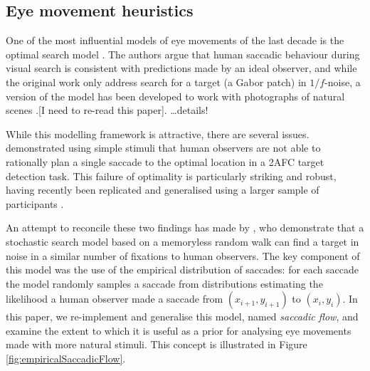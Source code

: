 \documentclass[a4paper, twocolumn, oneside, 10pt]{article}
\begin{document}
\subsection{Eye movement heuristics}

One of the most influential models of eye movements of the last decade is the optimal search model \citep{najemnik-geisler2008}. The authors argue that human saccadic behaviour during visual search is consistent with predictions made by an ideal observer, and while the original work only address search for a target (a Gabor patch) in $1/f$-noise, a version of the model has been developed to work with photographs of natural scenes \citep{abrams2014}.[I need to re-read this paper]. \ldots details!

While this modelling framework is attractive, there are several issues. \cite{morvan-maloney2012} demonstrated using simple stimuli that human observers are not able to rationally plan a single saccade to the optimal location in a 2AFC target detection task. This failure of optimality is particularly striking and robust, having recently been replicated and generalised using a larger sample of participants \citep{clarke-hunt2015}.

An attempt to reconcile these two findings has made by \cite{clarke2015}, who demonstrate that a stochastic search model based on a memoryless random walk can find a target in noise in a similar number of fixations to human observers. The key component of this model was the use of the empirical distribution of saccades: for each saccade the model randomly samples a saccade from distributions estimating the likelihood a human observer made a saccade from $(x_{i+1},y_{i+1})$ to $(x_i,y_i)$. In this paper, we re-implement and generalise this model, named \textit{saccadic flow}, and examine the extent to which it is useful as a prior for analysing eye movements made with more natural stimuli. This concept is illustrated in Figure \ref{fig:empiricalSaccadicFlow}.
\end{document}
